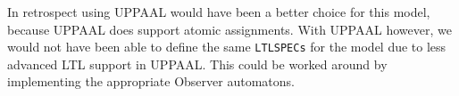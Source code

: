 \documentclass[a4paper,10pt]{article}
\begin{document}
	In retrospect using UPPAAL would have been a better choice for this model, because UPPAAL does support atomic assignments.
	With UPPAAL however, we would not have been able to define the same \texttt{LTLSPECs} for the model due to less advanced LTL support in UPPAAL.
	This could be worked around by implementing the appropriate Observer automatons.
\end{document}
